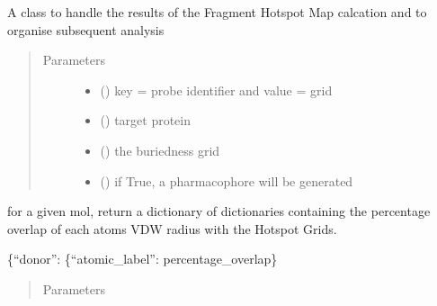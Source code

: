 \documentclass[letterpaper,10pt,english]{sphinxmanual}
\begin{document}
\begin{fulllineitems}
\label{\detokenize{result_api:hotspots.result.Results}}
A class to handle the results of the Fragment Hotspot Map calcation and to organise subsequent analysis
\begin{quote}\begin{description}
\item[{Parameters}] \leavevmode\begin{itemize}
\item {} 
 () \textendash{} key = probe identifier and value = grid

\item {} 
 () \textendash{} target protein

\item {} 
 () \textendash{} the buriedness grid

\item {} 
 () \textendash{} if True, a pharmacophore will be generated

\end{itemize}

\end{description}\end{quote}

\begin{fulllineitems}
\label{\detokenize{result_api:hotspots.result.Results.atomic_volume_overlap}}
for a given mol, return a dictionary of dictionaries containing the percentage overlap of each atoms
VDW radius with the Hotspot Grids.

\{“donor”: \{“atomic\_label”: percentage\_overlap\}
\begin{quote}\begin{description}
\item[{Parameters}] \leavevmode
{} \textendash{} 


\end{description}
\end{quote}
\end{fulllineitems}
\end{fulllineitems}
\end{document}
